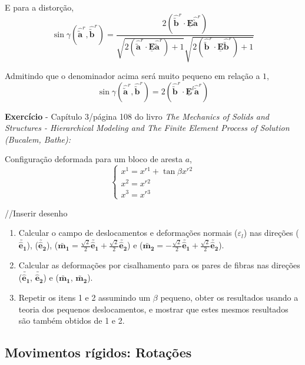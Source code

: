 	E para a distorção,
	\[\sin\gamma(\hat{\utilde{\mathbf{a}}}^r, \hat{\utilde{\mathbf{b}}}^r)=\frac{2(\hat{\utilde{\mathbf{b}}}^r\cdot\underline{\mathbf{E}}\hat{\utilde{\mathbf{a}}}^r)}{\sqrt{2(\hat{\utilde{\mathbf{a}}}^r\cdot\underline{\mathbf{E}}\hat{\utilde{\mathbf{a}}}^r)+1}\sqrt{2(\hat{\utilde{\mathbf{b}}}^r\cdot\underline{\mathbf{E}}\hat{\utilde{\mathbf{b}}}^r)+1}}\]
	
	Admitindo que o denominador acima será muito pequeno em relação a $1$,
	\[\sin\gamma(\hat{\utilde{\mathbf{a}}}^r, \hat{\utilde{\mathbf{b}}}^r)=2(\hat{\utilde{\mathbf{b}}}^r\cdot\underline{\mathbf{E}}^l\hat{\utilde{\mathbf{a}}}^r)\]
	
	\textbf{Exercício} - Capítulo 3/página 108 do livro \textit{The Mechanics of Solids and Structures - Hierarchical Modeling and The Finite Element Process of Solution (Bucalem, Bathe):}
	
	Configuração deformada para um bloco de aresta $a$,
	\[
	\begin{cases}
		x^1=x^{r1}+\tan\beta x^{r2} \\ x^2=x^{r2} \\ x^3=x^{r3}
	\end{cases}
	\]
	
	//Inserir desenho
	
	\begin{enumerate}
		\item Calcular o campo de deslocamentos e deformações normais ($\varepsilon_l$) nas direções ($\utilde{\mathbf{\hat{e}_1}}$), ($\utilde{\mathbf{\hat{e}_2}}$), ($\utilde{\mathbf{m_1}}=\frac{\sqrt{2}}{2}\utilde{\mathbf{\hat{e}_1}}+\frac{\sqrt{2}}{2}\utilde{\mathbf{\hat{e}_2}}$) e ($\utilde{\mathbf{m_2}}=-\frac{\sqrt{2}}{2}\utilde{\mathbf{\hat{e}_1}}+\frac{\sqrt{2}}{2}\utilde{\mathbf{\hat{e}_2}}$).
	\item Calcular as deformações por cisalhamento para os pares de fibras nas direções ($\utilde{\mathbf{\hat{e}_1}}$, $\utilde{\mathbf{\hat{e}_2}}$) e ($\utilde{\mathbf{m_1}}$, $\utilde{\mathbf{m_2}}$).
	\item Repetir os itens 1 e 2 assumindo um $\beta$ pequeno, obter os resultados usando a teoria dos pequenos deslocamentos, e mostrar que estes mesmos resultados são também obtidos de 1 e 2.
	\end{enumerate}
	
	\subsection{Movimentos rígidos: Rotações}
	

